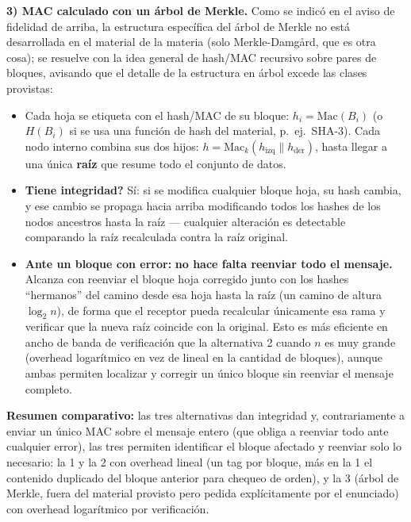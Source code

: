 \textbf{3) MAC calculado con un árbol de Merkle.}
Como se indicó en el aviso de fidelidad de arriba, la estructura específica del árbol de
Merkle no está desarrollada en el material de la materia (solo Merkle-Damgård, que es
otra cosa); se resuelve con la idea general de hash/MAC recursivo sobre pares de bloques,
avisando que el detalle de la estructura en árbol excede las clases provistas:
\begin{itemize}
  \item Cada hoja se etiqueta con el hash/MAC de su bloque: $h_i = \mathrm{Mac}(B_i)$
  (o $H(B_i)$ si se usa una función de hash del material, p.\ ej.\ SHA-3). Cada nodo
  interno combina sus dos hijos: $h = \mathrm{Mac}_k(h_{\text{izq}}\|h_{\text{der}})$,
  hasta llegar a una única \textbf{raíz} que resume todo el conjunto de datos.
  \item \textbf{\textquestiondown{}Tiene integridad?} Sí: si se modifica cualquier bloque hoja, su hash
  cambia, y ese cambio se propaga hacia arriba modificando todos los hashes de los
  nodos ancestros hasta la raíz --- cualquier alteración es detectable comparando la
  raíz recalculada contra la raíz original.
  \item \textbf{Ante un bloque con error:} \textbf{no hace falta reenviar todo el
  mensaje.} Alcanza con reenviar el bloque hoja corregido junto con los hashes
  ``hermanos'' del camino desde esa hoja hasta la raíz (un camino de altura
  $\log_2 n$), de forma que el receptor pueda recalcular únicamente esa rama y
  verificar que la nueva raíz coincide con la original. Esto es más eficiente en ancho
  de banda de verificación que la alternativa 2 cuando $n$ es muy grande (overhead
  logarítmico en vez de lineal en la cantidad de bloques), aunque ambas permiten
  localizar y corregir un único bloque sin reenviar el mensaje completo.
\end{itemize}

\textbf{Resumen comparativo:} las tres alternativas dan integridad y, contrariamente a
enviar un único MAC sobre el mensaje entero (que obliga a reenviar todo ante cualquier
error), las tres permiten identificar el bloque afectado y reenviar solo lo necesario:
la 1 y la 2 con overhead lineal (un tag por bloque, más en la 1 el contenido duplicado
del bloque anterior para chequeo de orden), y la 3 (árbol de Merkle, fuera del material
provisto pero pedida explícitamente por el enunciado) con overhead logarítmico por
verificación.

